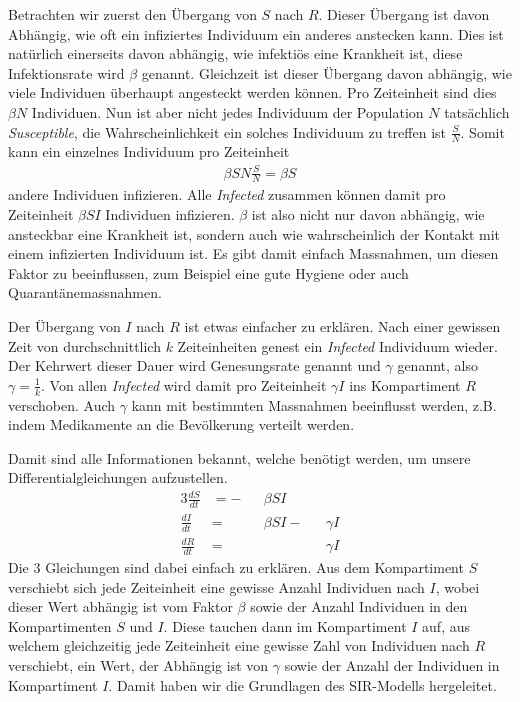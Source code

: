 \begin{refsection}
\begin{figure}[H]
  \centering
  
\end{figure}

Betrachten wir zuerst den Übergang von $S$ nach $R$.
Dieser Übergang ist davon Abhängig, wie oft ein infiziertes Individuum ein anderes anstecken kann.
Dies ist natürlich einerseits davon abhängig, wie infektiös eine Krankheit ist, diese Infektionsrate wird $\beta$ genannt.
Gleichzeit ist dieser Übergang davon abhängig, wie viele Individuen überhaupt angesteckt werden können. 
Pro Zeiteinheit sind dies $\beta N$ Individuen.
Nun ist aber nicht jedes Individuum der Population $N$ tatsächlich \emph{Susceptible}, die Wahrscheinlichkeit ein solches Individuum zu treffen ist $\frac{S}{N}$.
Somit kann ein einzelnes Individuum pro Zeiteinheit 
\begin{align*}
  \beta S N \frac{S}{N} = \beta S
\end{align*}
andere Individuen infizieren.
Alle \emph{Infected} zusammen können damit pro Zeiteinheit $\beta S I$ Individuen infizieren. 
$\beta$ ist also nicht nur davon abhängig, wie ansteckbar eine Krankheit ist, sondern auch wie wahrscheinlich der Kontakt mit einem infizierten Individuum ist. 
Es gibt damit einfach Massnahmen, um diesen Faktor zu beeinflussen, zum Beispiel eine gute Hygiene oder auch Quarantänemassnahmen.

Der Übergang von $I$ nach $R$ ist etwas einfacher zu erklären. 
Nach einer gewissen Zeit von durchschnittlich $k$ Zeiteinheiten genest ein \emph{Infected} Individuum wieder.
Der Kehrwert dieser Dauer wird Genesungsrate genannt und $\gamma$ genannt, also $\gamma = \frac{1}{k}$.
Von allen \emph{Infected} wird damit pro Zeiteinheit $\gamma I$ ins Kompartiment $R$ verschoben.
Auch $\gamma$ kann mit bestimmten Massnahmen beeinflusst werden, z.B. indem Medikamente an die Bevölkerung verteilt werden.

Damit sind alle Informationen bekannt, welche benötigt werden, um unsere Differentialgleichungen aufzustellen. 
\begin{alignat*}{3}
  \frac{dS}{dt} & = - && \beta S I  \\
  \frac{dI}{dt} & =   && \beta S I - && \gamma I \\
  \frac{dR}{dt} & =   &&             && \gamma I 
\end{alignat*}
Die 3 Gleichungen sind dabei einfach zu erklären. 
Aus dem Kompartiment $S$ verschiebt sich jede Zeiteinheit eine gewisse Anzahl Individuen nach $I$, wobei dieser Wert abhängig ist vom Faktor $\beta$ sowie der Anzahl Individuen in den Kompartimenten $S$ und $I$.
Diese tauchen dann im Kompartiment $I$ auf, aus welchem gleichzeitig jede Zeiteinheit eine gewisse Zahl von Individuen nach $R$ verschiebt, ein Wert, der Abhängig ist von $\gamma$ sowie der Anzahl der Individuen in Kompartiment $I$. 
Damit haben wir die Grundlagen des SIR-Modells hergeleitet. 


\end{refsection}
